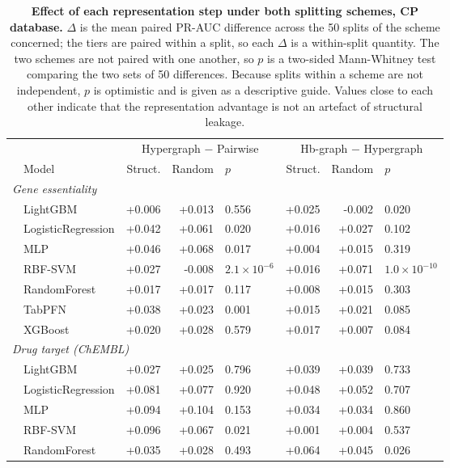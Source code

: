 \begin{table}[ht]
\centering
\small
\caption{\textbf{Effect of each representation step under both splitting
schemes, CP database.} $\Delta$ is the mean paired PR-AUC difference
across the 50 splits of the scheme concerned; the tiers are paired within
a split, so each $\Delta$ is a within-split quantity. The two schemes are
not paired with one another, so $p$ is a two-sided Mann-Whitney test
comparing the two sets of 50 differences. Because splits within a scheme
are not independent, $p$ is optimistic and is given as a descriptive
guide. Values close to each other indicate that the representation
advantage is not an artefact of structural leakage.}
\label{tab:splitting-steps}
\begin{tabular*}{\textwidth}{@{\extracolsep{\fill}}ll rrl rrl@{}}
\toprule
& & \multicolumn{3}{c}{Hypergraph $-$ Pairwise}
  & \multicolumn{3}{c}{Hb-graph $-$ Hypergraph} \\
\cmidrule(lr){3-5} \cmidrule(lr){6-8}
& Model & Struct. & Random & $p$ & Struct. & Random & $p$ \\
\multicolumn{8}{l}{\textit{Gene essentiality}} \\
  & LightGBM & +0.006 & +0.013 & 0.556 & +0.025 & -0.002 & 0.020 \\
  & LogisticRegression & +0.042 & +0.061 & 0.020 & +0.016 & +0.027 & 0.102 \\
  & MLP & +0.046 & +0.068 & 0.017 & +0.004 & +0.015 & 0.319 \\
  & RBF-SVM & +0.027 & -0.008 & $2.1\times10^{-6}$ & +0.016 & +0.071 & $1.0\times10^{-10}$ \\
  & RandomForest & +0.017 & +0.017 & 0.117 & +0.008 & +0.015 & 0.303 \\
  & TabPFN & +0.038 & +0.023 & 0.001 & +0.015 & +0.021 & 0.085 \\
  & XGBoost & +0.020 & +0.028 & 0.579 & +0.017 & +0.007 & 0.084 \\
\midrule
\multicolumn{8}{l}{\textit{Drug target (ChEMBL)}} \\
  & LightGBM & +0.027 & +0.025 & 0.796 & +0.039 & +0.039 & 0.733 \\
  & LogisticRegression & +0.081 & +0.077 & 0.920 & +0.048 & +0.052 & 0.707 \\
  & MLP & +0.094 & +0.104 & 0.153 & +0.034 & +0.034 & 0.860 \\
  & RBF-SVM & +0.096 & +0.067 & 0.021 & +0.001 & +0.004 & 0.537 \\
  & RandomForest & +0.035 & +0.028 & 0.493 & +0.064 & +0.045 & 0.026 \\

\end{tabular*}
\end{table}
